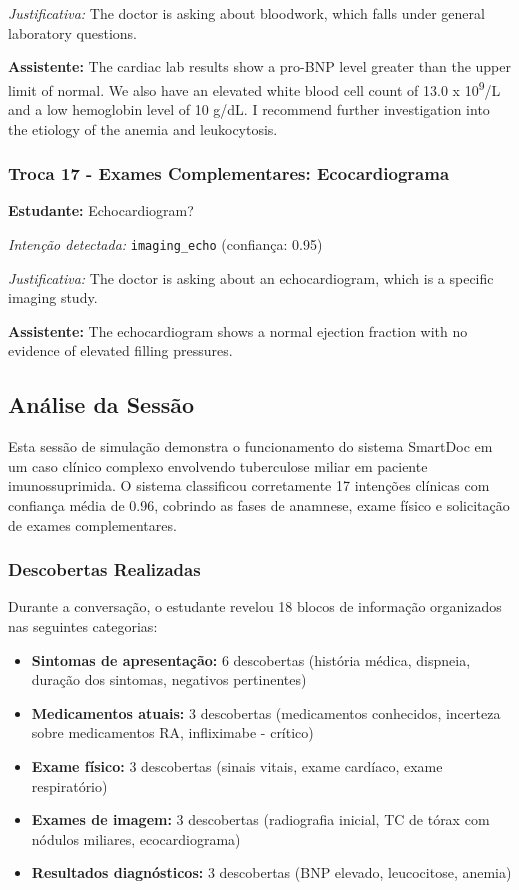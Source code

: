 \textit{Justificativa:} The doctor is asking about bloodwork, which falls under general laboratory questions.

\textbf{Assistente:} The cardiac lab results show a pro-BNP level greater than the upper limit of normal. We also have an elevated white blood cell count of 13.0 x 10\textsuperscript{9}/L and a low hemoglobin level of 10 g/dL. I recommend further investigation into the etiology of the anemia and leukocytosis.

\vspace{0.5cm}

\subsubsection*{Troca 17 - Exames Complementares: Ecocardiograma}

\textbf{Estudante:} Echocardiogram?

\textit{Intenção detectada:} \texttt{imaging\_echo} (confiança: 0.95)

\textit{Justificativa:} The doctor is asking about an echocardiogram, which is a specific imaging study.

\textbf{Assistente:} The echocardiogram shows a normal ejection fraction with no evidence of elevated filling pressures.

\vspace{0.5cm}

\subsection{Análise da Sessão}

Esta sessão de simulação demonstra o funcionamento do sistema SmartDoc em um caso clínico complexo envolvendo tuberculose miliar em paciente imunossuprimida. O sistema classificou corretamente 17 intenções clínicas com confiança média de 0.96, cobrindo as fases de anamnese, exame físico e solicitação de exames complementares.

\subsubsection*{Descobertas Realizadas}

Durante a conversação, o estudante revelou 18 blocos de informação organizados nas seguintes categorias:
\begin{itemize}
    \item \textbf{Sintomas de apresentação:} 6 descobertas (história médica, dispneia, duração dos sintomas, negativos pertinentes)
    \item \textbf{Medicamentos atuais:} 3 descobertas (medicamentos conhecidos, incerteza sobre medicamentos RA, infliximabe - crítico)
    \item \textbf{Exame físico:} 3 descobertas (sinais vitais, exame cardíaco, exame respiratório)
    \item \textbf{Exames de imagem:} 3 descobertas (radiografia inicial, TC de tórax com nódulos miliares, ecocardiograma)
    \item \textbf{Resultados diagnósticos:} 3 descobertas (BNP elevado, leucocitose, anemia)
\end{itemize}

